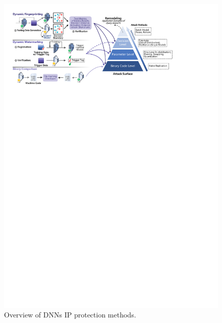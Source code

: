\documentclass[journal]{IEEEtran}
\begin{document}
\begin{figure}[t]
  \centering
  \includegraphics[width=\linewidth]{fig/ip_protection.pdf}
  \caption{Overview of DNNs IP protection methods.}
  \label{fig:ip}
\end{figure}
\end{document}
